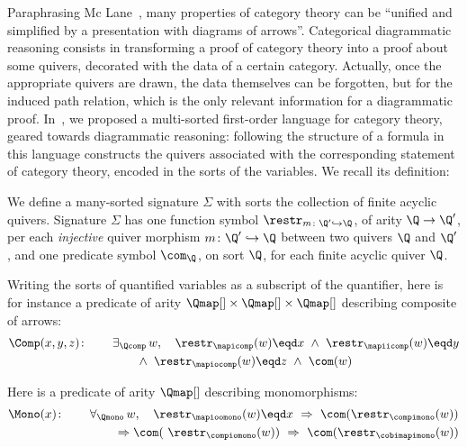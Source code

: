 Paraphrasing Mc Lane~\cite{zbMATH01216133}, many properties of category theory can be \enquote{unified and simplified by a presentation with diagrams of arrows}. Categorical diagrammatic reasoning consists in transforming a proof of category theory into a proof about some quivers, decorated with the data of a certain category. Actually, once the appropriate quivers are drawn, the data themselves can be forgotten, but for the induced path relation, which is the only relevant information for a diagrammatic proof. In~\cite{DBLP:conf/csl/MahboubiP24}, we proposed a multi-sorted first-order language for category theory, geared towards diagrammatic reasoning: following the structure of a formula in this language constructs the quivers associated with the corresponding statement of category theory, encoded in the sorts of the variables. We recall its definition:
\begin{definition}\label{def:sig}
    We define a many-sorted signature $\Sigma$ with sorts the collection of finite acyclic quivers. Signature\/ $\Sigma$ has one function symbol $\restr_{m\colon \Q'\hookrightarrow \Q}$, of arity $\Q \to \Q'$, per each \emph{injective} quiver morphism $m\colon \Q' \hookrightarrow \Q$ between two quivers $\Q$ and $\Q'$, and one predicate symbol $\com_\Q$, on sort $\Q$, for each finite acyclic quiver $\Q$.
  \end{definition}

\begin{example}
Writing the sorts of quantified variables as a subscript of the quantifier, here is for instance a predicate of arity $\Qmap[] \times \Qmap[] \times \Qmap[]$ describing composite of arrows:
\begin{align*}
  \Comp(x,y,z)\colon\qquad& \exists_{\Qcomp}\, w,\quad \restr_{\mapicomp}(w) \eqd x \ \wedge \ \restr_{\mapiicomp}(w) \eqd y \\
  &\qquad \wedge \ \restr_{\mapiocomp}(w) \eqd z \ \wedge \ \com(w)
\end{align*}
\end{example}

\begin{example}\label{ex:mono}
  Here is a predicate of arity $\Qmap[]$ describing monomorphisms:
  \begin{align*}
    \Mono(x)\colon\qquad& \forall_{\Qmono}\, w,\quad \restr_{\mapioomono}(w) \eqd x \ \Rightarrow \ \com(\restr_{\compimono}(w))  \\
    &\qquad \Rightarrow \com(\ \restr_{\compiomono}(w)) \ \Rightarrow \ \com(\restr_{\cobimapimono}(w))
  \end{align*}
\end{example}

